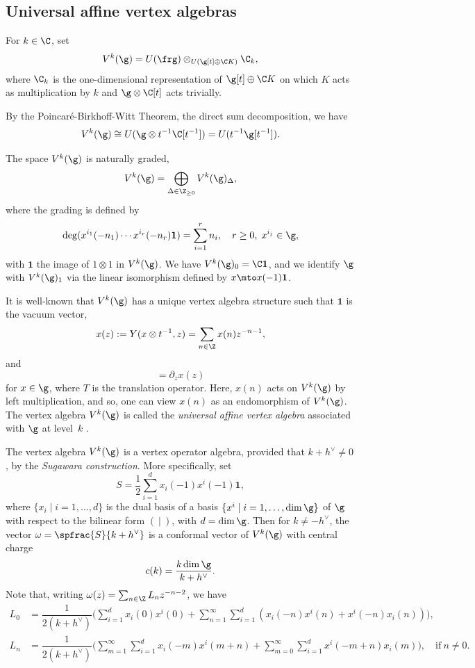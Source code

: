 \subsection{Universal affine vertex algebras}
\label{sec:Universal affine vertex algebras}
For $k \in \C$, set
\begin{equation*}
V^k(\g)=U(\frg)\otimes _{U(\g [t]\oplus \C K)}\C_k,
\end{equation*}
where $\C_k$ is the one-dimensional representation of $\g [t]\oplus \C K$
on which $K$ acts as multiplication by $k$ and $\g\otimes \C[t]$ acts trivially.

By the Poincaré-Birkhoff-Witt Theorem, the direct sum decomposition,
we have
\begin{equation}
V^k(\g)\cong U(\g \otimes t^{-1}\C[t^{-1}]) = U(t^{-1} \g[t^{-1}]).
\label{eq:PBW}
\end{equation}

The space $V^k(\g)$ is naturally graded,
\begin{equation*}
V^k(\g) =\bigoplus_{\Delta\in \Z_{\geq 0}}V^k(\g) _{\Delta},
\end{equation*}
where the grading is defined by
\[
\deg (x^{i_1}(-n_1)\cdots x^{i_r}(-n_r) \mathbf{1}) = \sum_{i=1}^r n_i,
\quad r \geq 0, \; x^{i_j} \in \g,
\]
with $\mathbf{1}$ the image of $1\otimes 1$ in $V^k(\g)$.
We have $V^k(\g)_0=\C\mathbf{1} $,
and we identify $\g$ with $V^k(\g)_1$ via the linear isomorphism
defined by $x\mto x(-1)\mathbf{1} $.

It is well-known that $V^k(\g)$ has a unique vertex algebra structure
such that $\mathbf{1}$ is the vacuum vector,
\[
x(z) := Y(x\otimes t^{-1},z) =\sum_{n \in \Z} x(n) z^{-n-1},
\]
and
\begin{equation*}
[T,x(z)]=\partial_z x(z)
\end{equation*}
for $x \in \g$,
where $T$ is the translation operator.
Here, $x(n)$ acts on $V^k(\g)$ by left multiplication, and
so, one can view $x(n)$ as an endomorphism of $V^k(\g)$.
The vertex algebra
$V^k(\g)$ is called the \emph{universal affine vertex algebra}
associated with $\g$ at level~$k$ \cite{FZ,Zhu96,LL}.

The vertex algebra
$V^k(\g)$ is a vertex operator algebra, provided that $k+h^\vee\not=0$,
by the \emph{Sugawara construction}.
More specifically, set
\[
S=\displaystyle{\frac{1}{2}} \sum_{i=1}^{d}
x_{i}(-1) x^{i}(-1) \mathbf{1},
\]
where $\{x_{i}\mid i=1,\dots,d\}$ is the dual
basis of a basis $\{x^{i}\mid i=1,\dots,\dim \g\}$ of $\g$
with respect to the bilinear form $(~|~)$, with $d = \dim \g$.
Then for $k \not=-h^\vee$, the vector
$\omega=\displaystyle{\spfrac{S}{k+h^\vee}}$
is a conformal vector of $V^k(\g)$ with central charge
\[
c(k)=\displaystyle{\frac{k \dim \g}{k+h^\vee}}.
\]
Note that, writing $\omega(z) = \sum_{n \in \Z} L_n z^{-n-2}$,
we have
\begin{align*}
L_0&= \dfrac{1}{2(k+h^\vee)}
\biggl(\sum_{i=1}^{d}x_i(0)x^i(0)+\sum_{n=1}^{\infty}\sum_{i=1}^{d}(x_i(-n)x^i(n)+x^i(-n)x_i(n)) \biggr),\\
L_n&=\dfrac{1}{2(k+h^\vee)}
\biggl(\sum_{m=1}^{\infty}\sum_{i=1}^{d}x_i(-m)x^i(m+n)
+\sum_{m=0}^{\infty}\sum_{i=1}^{d}x^i(-m+n)x_i(m)\biggr), \quad
\text{if} \ n\!\neq\! 0.
\end{align*}

